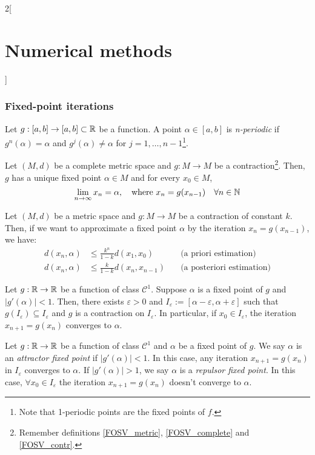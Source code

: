 \documentclass[../../../main.tex]{subfiles}
\begin{document}
\begin{multicols}{2}[\section{Numerical methods}]
    \subsubsection*{Fixed-point iterations}
    \begin{definition}
        Let $g:[a,b]\rightarrow[a,b]\subset\mathbb{R}$ be a function. A point $\alpha\in[a,b]$ is \textit{n-periodic} if $g^n(\alpha)=\alpha$ and $g^j(\alpha)\ne\alpha$ for $j=1,\ldots,n-1$\footnote{Note that 1-periodic points are the fixed points of $f$.}.
    \end{definition}
    \begin{theorem}
        Let $(M,d)$ be a complete metric space and $g:M\rightarrow M$ be a contraction\footnote{Remember definitions \ref{FOSV_metric}, \ref{FOSV_complete} and \ref{FOSV_contr}.}. Then, $g$ has a unique fixed point $\alpha\in M$ and for every $x_0\in M$, $$\lim_{n\to\infty}x_n=\alpha,\quad\text{where }x_n=g(x_{n-1})\quad\forall n\in\mathbb{N}$$
    \end{theorem}
    \begin{prop}
        Let $(M,d)$ be a metric space and $g:M\rightarrow M$ be a contraction of constant $k$. Then, if we want to approximate a fixed point $\alpha$ by the iteration $x_n=g(x_{n-1})$, we have:
        \begin{align*}
            d(x_n,\alpha) & \leq\frac{k^n}{1-k}d(x_1,x_0)\quad   & \text{(a priori estimation)}     \\
            d(x_n,\alpha) & \leq\frac{k}{1-k}d(x_n,x_{n-1})\quad & \text{(a posteriori estimation)}
        \end{align*}
    \end{prop}
    \begin{corollary}
        Let $g:\mathbb{R}\rightarrow\mathbb{R}$ be a function of class $\mathcal{C}^1$. Suppose $\alpha$ is a fixed point of $g$ and $|g'(\alpha)|<1$. Then, there exists $\varepsilon>0$ and $I_\varepsilon:=[\alpha-\varepsilon,\alpha+\varepsilon]$ such that $g(I_\varepsilon)\subseteq I_\varepsilon$ and $g$ is a contraction on $I_\varepsilon$. In particular, if $x_0\in I_\varepsilon$, the iteration $x_{n+1}=g(x_n)$ converges to $\alpha$.
    \end{corollary}
    \begin{definition}
        Let $g:\mathbb{R}\rightarrow\mathbb{R}$ be a function of class $\mathcal{C}^1$ and $\alpha$ be a fixed point of $g$. We say $\alpha$ is an \textit{attractor fixed point} if $|g'(\alpha)|<1$. In this case, any iteration $x_{n+1}=g(x_n)$ in $I_\varepsilon$ converges to $\alpha$. If $|g'(\alpha)|>1$, we say $\alpha$ is a \textit{repulsor fixed point}. In this case, $\forall x_0\in I_\varepsilon$ the iteration $x_{n+1}=g(x_n)$ doesn't converge to $\alpha$.

\end{definition}
\end{multicols}
\end{document}
